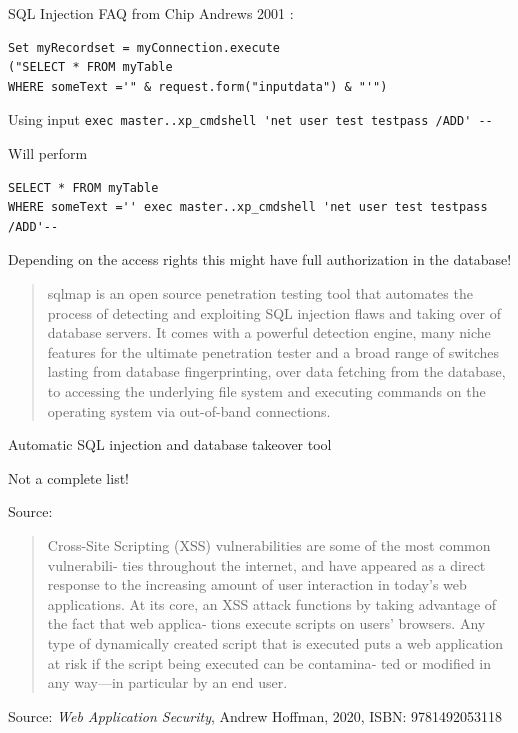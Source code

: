 \documentclass[Screen16to9,17pt]{foils}
\begin{document}

SQL Injection FAQ from Chip Andrews 2001 :

\begin{verbatim}
Set myRecordset = myConnection.execute
("SELECT * FROM myTable
WHERE someText ='" & request.form("inputdata") & "'")
\end{verbatim}

Using input \verb+exec master..xp_cmdshell 'net user test testpass /ADD' --+

Will perform
\begin{verbatim}
SELECT * FROM myTable
WHERE someText ='' exec master..xp_cmdshell 'net user test testpass /ADD'--
\end{verbatim}

Depending on the access rights this might have full authorization in the database!


\begin{quote}\footnotesize
sqlmap is an open source penetration testing tool that automates the process of detecting and exploiting SQL injection flaws and taking over of database servers. It comes with a powerful detection engine, many niche features for the ultimate penetration tester and a broad range of switches lasting from database fingerprinting, over data fetching from the database, to accessing the underlying file system and executing commands on the operating system via out-of-band connections.

\end{quote}

\begin{list1}
\item Automatic SQL injection and database takeover tool
\end{list1}



Not a complete list!

Source: 


\begin{quote}\small
  Cross-Site Scripting (XSS) vulnerabilities are some of the most common vulnerabili‐
  ties throughout the internet, and have appeared as a direct response to the increasing
  amount of user interaction in today’s web applications.
  At its core, an XSS attack functions by taking advantage of the fact that web applica‐
  tions execute scripts on users’ browsers. Any type of dynamically created script that is
  executed puts a web application at risk if the script being executed can be contamina‐
  ted or modified in any way—in particular by an end user.
\end{quote}
Source: \emph{Web Application Security}, Andrew Hoffman, 2020, ISBN: 9781492053118
\end{document}
